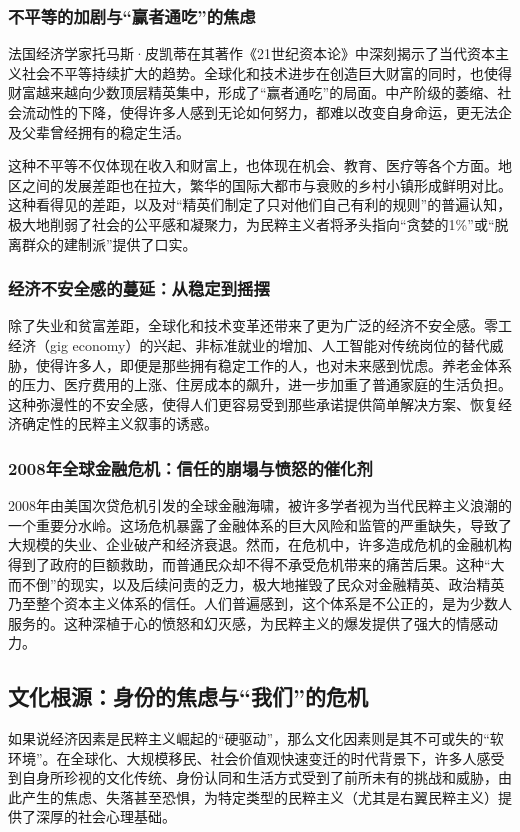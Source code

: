\documentclass[UTF8, 10pt]{ctexbook}
\begin{document}
\subsubsection{不平等的加剧与“赢者通吃”的焦虑}
法国经济学家托马斯·皮凯蒂在其著作《21世纪资本论》中深刻揭示了当代资本主义社会不平等持续扩大的趋势。全球化和技术进步在创造巨大财富的同时，也使得财富越来越向少数顶层精英集中，形成了“赢者通吃”的局面。中产阶级的萎缩、社会流动性的下降，使得许多人感到无论如何努力，都难以改变自身命运，更无法企及父辈曾经拥有的稳定生活。

这种不平等不仅体现在收入和财富上，也体现在机会、教育、医疗等各个方面。地区之间的发展差距也在拉大，繁华的国际大都市与衰败的乡村小镇形成鲜明对比。这种看得见的差距，以及对“精英们制定了只对他们自己有利的规则”的普遍认知，极大地削弱了社会的公平感和凝聚力，为民粹主义者将矛头指向“贪婪的1\%”或“脱离群众的建制派”提供了口实。

\subsubsection{经济不安全感的蔓延：从稳定到摇摆}
除了失业和贫富差距，全球化和技术变革还带来了更为广泛的经济不安全感。零工经济（gig economy）的兴起、非标准就业的增加、人工智能对传统岗位的替代威胁，使得许多人，即便是那些拥有稳定工作的人，也对未来感到忧虑。养老金体系的压力、医疗费用的上涨、住房成本的飙升，进一步加重了普通家庭的生活负担。这种弥漫性的不安全感，使得人们更容易受到那些承诺提供简单解决方案、恢复经济确定性的民粹主义叙事的诱惑。

\subsubsection{2008年全球金融危机：信任的崩塌与愤怒的催化剂}
2008年由美国次贷危机引发的全球金融海啸，被许多学者视为当代民粹主义浪潮的一个重要分水岭。这场危机暴露了金融体系的巨大风险和监管的严重缺失，导致了大规模的失业、企业破产和经济衰退。然而，在危机中，许多造成危机的金融机构得到了政府的巨额救助，而普通民众却不得不承受危机带来的痛苦后果。这种“大而不倒”的现实，以及后续问责的乏力，极大地摧毁了民众对金融精英、政治精英乃至整个资本主义体系的信任。人们普遍感到，这个体系是不公正的，是为少数人服务的。这种深植于心的愤怒和幻灭感，为民粹主义的爆发提供了强大的情感动力。

\subsection{文化根源：身份的焦虑与“我们”的危机}
如果说经济因素是民粹主义崛起的“硬驱动”，那么文化因素则是其不可或失的“软环境”。在全球化、大规模移民、社会价值观快速变迁的时代背景下，许多人感受到自身所珍视的文化传统、身份认同和生活方式受到了前所未有的挑战和威胁，由此产生的焦虑、失落甚至恐惧，为特定类型的民粹主义（尤其是右翼民粹主义）提供了深厚的社会心理基础。
\end{document}
